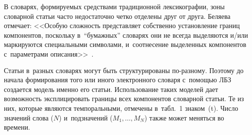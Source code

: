 \begin{multicols}{2}
{}
    
    В словарях, формируемых средствами традиционной лексикографии, 
зоны словарной статьи часто недостаточно четко отделены друг от друга. 
Беляева отмечает: <<Особую сложность представляет собственно 
установление границ компонентов, поскольку в~``бумажных'' словарях они не 
всегда выделяются и/или маркируются специальными символами, 
и~соотнесение выделенных компонентов с~параметрами  
описания>>~\cite{19-gon}.
    
    Статьи в~разных словарях могут быть структурированы по-разному. 
Поэтому до начала формирования того или иного электронного словаря 
с~помощью ЛБЗ создается модель именно его \mbox{статьи}. Использование таких 
моделей дает возможность эксплицировать границы всех компонентов 
словарной статьи. Те из них, которые являются темпоральными, отмечены 
в~табл.~1 знаком~(t). Число значений слова ($N$) и~подзначений 
($M_1,\ldots , M_N$) также может меняться во времени.

\begin{table*}\small %
\begin{center}
\vspace*{2ex}


\end{center}
\end{table*}
\end{multicols}
